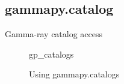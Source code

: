 \subsection{gammapy.catalog}
\label{ssec:gammapy-catalog}
Gamma-ray catalog access

\begin{figure}
	{gp_catalogs}
	\caption{Using gammapy.catalogs}
	\label{codeexample:data}
\end{figure}

